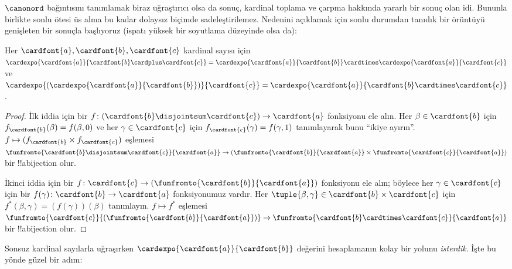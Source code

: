 


$\canonord$ bağıntısını tanımlamak biraz uğraştırıcı olsa da sonuç,
kardinal toplama ve çarpma hakkında yararlı bir sonuç olan
 idi. Bununla birlikte sonlu ötesi üs alma
bu kadar dolaysız biçimde sadeleştirilemez. Nedenini açıklamak için sonlu
durumdan tanıdık bir örüntüyü genişleten bir sonuçla başlıyoruz (ispatı
yüksek bir soyutlama düzeyinde olsa da):

\begin{prop}
Her $\cardfont{a},\cardfont{b},\cardfont{c}$ kardinal sayısı için
$\cardexpo{\cardfont{a}}{\cardfont{b} \cardplus \cardfont{c}} =
\cardexpo{\cardfont{a}}{\cardfont{b}} \cardtimes
\cardexpo{\cardfont{a}}{\cardfont{c}}$ ve
$\cardexpo{(\cardexpo{\cardfont{a}}{\cardfont{b}})}{\cardfont{c}} =
\cardexpo{\cardfont{a}}{\cardfont{b} \cardtimes \cardfont{c}}$.
\end{prop}

\begin{proof}
İlk iddia için bir $f\colon
(\cardfont{b}\disjointsum\cardfont{c})\to\cardfont{a}$ fonksiyonu ele
alın. Her $\beta\in\cardfont{b}$ için
$f_\cardfont{b}(\beta)=f(\beta,0)$ ve her
$\gamma\in\cardfont{c}$ için $f_\cardfont{c}(\gamma)=f(\gamma,1)$
tanımlayarak bunu ``ikiye ayırın''. $f\mapsto
(f_\cardfont{b}\times f_\cardfont{c})$ eşlemesi
$\funfromto{\cardfont{b} \disjointsum \cardfont{c}}{\cardfont{a}} \to
(\funfromto{\cardfont{b}}{\cardfont{a}} \times
\funfromto{\cardfont{c}}{\cardfont{a}})$ bir !!a{bijection} olur.

İkinci iddia için bir $f\colon\cardfont{c}\to
(\funfromto{\cardfont{b}}{\cardfont{a}})$ fonksiyonu ele alın; böylece
her $\gamma\in\cardfont{c}$ için bir
$f(\gamma)\colon\cardfont{b}\to\cardfont{a}$ fonksiyonumuz vardır. Her
$\tuple{\beta,\gamma}\in\cardfont{b}\times\cardfont{c}$ için
$f^*(\beta,\gamma)=(f(\gamma))(\beta)$ tanımlayın. $f\mapsto f^*$
eşlemesi
$\funfromto{\cardfont{c}}{(\funfromto{\cardfont{b}}{\cardfont{a}})}
\to \funfromto{\cardfont{b} \cardtimes \cardfont{c}}{\cardfont{a}}$
bir !!a{bijection} olur.
\end{proof}

Sonsuz kardinal sayılarla uğraşırken
$\cardexpo{\cardfont{a}}{\cardfont{b}}$ değerini hesaplamanın kolay bir
yolunu \emph{isterdik}. İşte bu yönde güzel bir adım:

